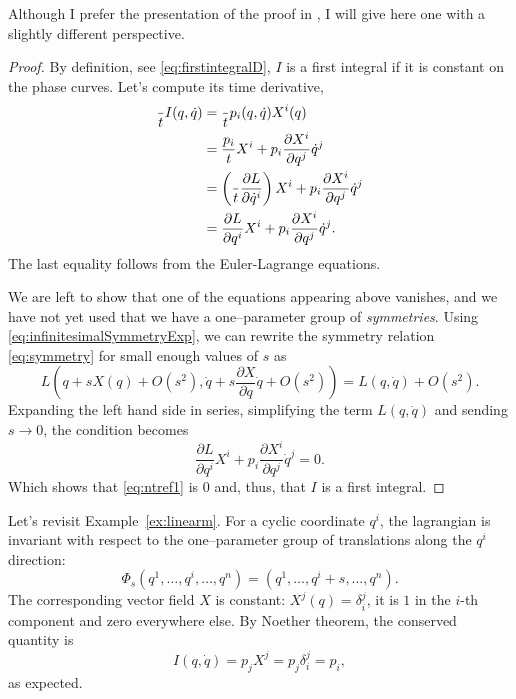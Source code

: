 \documentclass[english,fontsize=11pt,paper=a5,oneside]{scrbook}
\let\d\relax
\newcommand{\d}{\mathrm{d}}
\theoremstyle{definition}
\newenvironment{example}
  {\pushQED{\qed}\renewcommand{\qedsymbol}{$\lozenge$}\examplex}
  {\popQED\endexamplex}
\begin{document}
Although I prefer the presentation of the proof in \cite[Chapter 20.B]{book:arnold}, I will give here one with a slightly different perspective.
\begin{proof}
  By definition, see \eqref{eq:firstintegralD}, $I$ is a first integral if it is constant on the phase curves.
  Let's compute its time derivative,
  \begin{align}
    \frac{\d}{\d t} I(q, \dot q)
     & = \frac{\d}{\d t} p_i(q, \dot q) X^i(q)                                                                                 \\
     & = \frac{\d p_i}{\d t} X^i + p_i \frac{\partial X^i}{\partial q^j} \dot q^j                                              \\
     & = \left(\frac{\d}{\d t}\frac{\partial L}{\partial \dot q^i}\right) X^i + p_i \frac{\partial X^i}{\partial q^j} \dot q^j \\
     & = \frac{\partial L}{\partial q^i} X^i + p_i \frac{\partial X^i}{\partial q^j} \dot q^j. \label{eq:ntref1}
  \end{align}
  The last equality follows from the Euler-Lagrange equations.

  We are left to show that one of the equations appearing above vanishes, and we have not yet used that we have a one--parameter group of \emph{symmetries}.
  Using \eqref{eq:infinitesimalSymmetryExp}, we can rewrite the symmetry relation \eqref{eq:symmetry} for small enough values of $s$ as
  \begin{equation}\label{eq:invariance}
    L\left( q + s X(q) + O(s^2), \dot q + s \frac{\partial X}{\partial q} \dot q + O(s^2) \right) = L(q, \dot q) + O(s^2).
  \end{equation}
  Expanding the left hand side in series, simplifying the term $L(q, \dot q)$ and sending $s\to 0$, the condition becomes
  \begin{equation}\label{eq:ntref2}
    \frac{\partial L}{\partial q^i} X^i + p_i \frac{\partial X^i}{\partial q^j} \dot q^j = 0.
  \end{equation}
  Which shows that \eqref{eq:ntref1} is $0$ and, thus, that $I$ is a first integral.
\end{proof}

\begin{example}[kinetic momentum - reprise]\label{exa:kmom}
  Let's revisit Example~\ref{ex:linearm}.
  For a cyclic coordinate $q^i$, the lagrangian is invariant with respect to the one--parameter group of translations along the $q^i$ direction:
  \begin{equation}
    \Phi_s(q^1, \ldots, q^i, \ldots, q^n) = (q^1, \ldots, q^i + s, \ldots, q^n).
  \end{equation}
  The corresponding vector field $X$ is constant: $X^j(q) = \delta^j_i$, it is $1$ in the $i$-th component and zero everywhere else.
  By Noether theorem, the conserved quantity is
  \begin{equation}
    I(q,\dot q) = p_j X^j = p_j \delta^j_i = p_i,
  \end{equation}
  as expected.
\end{example}
\end{document}
